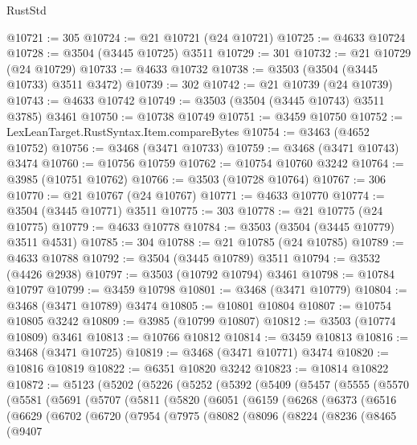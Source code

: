 \begin{lexlean}{RustStd}
\begin{coremodule}
@10721 := 305
@10724 := @21 @10721 (@24 @10721)
@10725 := @4633 @10724
@10728 := @3504 (@3445 @10725) @3511
@10729 := 301
@10732 := @21 @10729 (@24 @10729)
@10733 := @4633 @10732
@10738 := @3503 (@3504 (@3445 @10733) @3511 @3472)
@10739 := 302
@10742 := @21 @10739 (@24 @10739)
@10743 := @4633 @10742
@10749 := @3503 (@3504 (@3445 @10743) @3511 @3785) @3461
@10750 := @10738 @10749
@10751 := @3459 @10750
@10752 := LexLeanTarget.RustSyntax.Item.compareBytes
@10754 := @3463 (@4652 @10752)
@10756 := @3468 (@3471 @10733)
@10759 := @3468 (@3471 @10743) @3474
@10760 := @10756 @10759
@10762 := @10754 @10760 @3242
@10764 := @3985 (@10751 @10762)
@10766 := @3503 (@10728 @10764)
@10767 := 306
@10770 := @21 @10767 (@24 @10767)
@10771 := @4633 @10770
@10774 := @3504 (@3445 @10771) @3511
@10775 := 303
@10778 := @21 @10775 (@24 @10775)
@10779 := @4633 @10778
@10784 := @3503 (@3504 (@3445 @10779) @3511 @4531)
@10785 := 304
@10788 := @21 @10785 (@24 @10785)
@10789 := @4633 @10788
@10792 := @3504 (@3445 @10789) @3511
@10794 := @3532 (@4426 @2938)
@10797 := @3503 (@10792 @10794) @3461
@10798 := @10784 @10797
@10799 := @3459 @10798
@10801 := @3468 (@3471 @10779)
@10804 := @3468 (@3471 @10789) @3474
@10805 := @10801 @10804
@10807 := @10754 @10805 @3242
@10809 := @3985 (@10799 @10807)
@10812 := @3503 (@10774 @10809) @3461
@10813 := @10766 @10812
@10814 := @3459 @10813
@10816 := @3468 (@3471 @10725)
@10819 := @3468 (@3471 @10771) @3474
@10820 := @10816 @10819
@10822 := @6351 @10820 @3242
@10823 := @10814 @10822
@10872 := @5123
    (@5202
      (@5226
        (@5252
          (@5392
            (@5409
              (@5457
                (@5555
                  (@5570
                    (@5581
                      (@5691
                        (@5707
                          (@5811
                            (@5820
                              (@6051
                                (@6159
                                  (@6268
                                    (@6373
                                      (@6516
                                        (@6629
                                          (@6702
                                            (@6720
                                              (@7954
                                                (@7975
                                                  (@8082
                                                    (@8096
                                                      (@8224
                                                        (@8236
                                                          (@8465
                                                            (@9407

\end{coremodule}
\end{lexlean}

